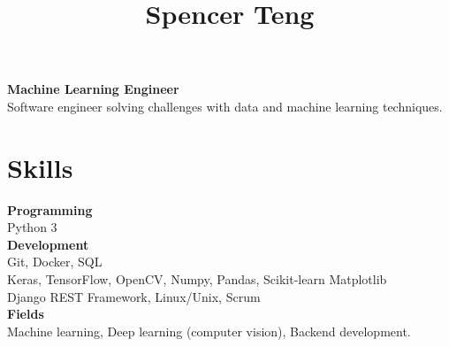 \documentclass[11pt]{article} %
\begin{document}
{\selectfont



\hspace{-1.2em}\title{ Spencer Teng } %

\noindent\begin{minipage}[t]{0.70\textwidth}
\vspace{0.5em}
\textbf{Machine Learning Engineer} \\

Software engineer solving challenges with data and machine learning techniques. 


\section{Skills}
\textbf{Programming}\\
Python 3 \\

\textbf{Development}\\
Git, Docker, SQL \\
Keras, TensorFlow, OpenCV, Numpy, Pandas, Scikit-learn Matplotlib \\
Django REST Framework, Linux/Unix, Scrum \\

\textbf{Fields}\\
Machine learning, Deep learning (computer vision), Backend development.


\end{minipage}}
\end{document}

